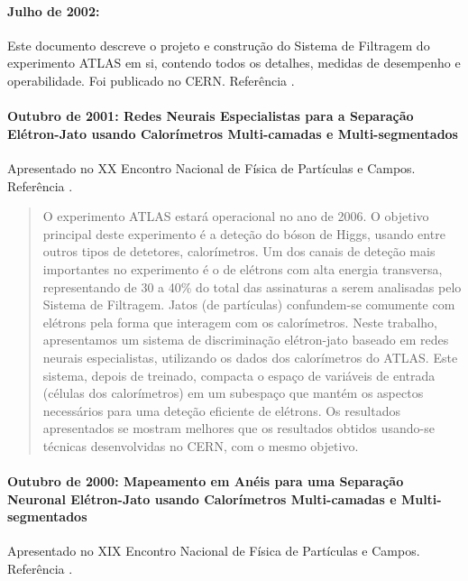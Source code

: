 \paragraph{Julho de 2002: } Este documento descreve o
projeto e construção do Sistema de Filtragem do experimento ATLAS em si,
contendo todos os detalhes, medidas de desempenho e operabilidade. Foi
publicado no CERN. Referência \cite{hlt-tdr}.

\paragraph{Outubro de 2001: Redes Neurais Especialistas para a Separação
Elétron-Jato usando Calorímetros Multi-camadas e Multi-segmentados}
Apresentado no XX Encontro Nacional de Física de Partículas e
Campos. Referência \cite{aa:enfpc-01}.

\begin{quotation}
O experimento ATLAS estará operacional no ano de 2006. O objetivo principal
deste experimento é a deteção do bóson de Higgs, usando entre outros tipos de
detetores, calorímetros. Um dos canais de deteção mais importantes no
experimento é o de elétrons com alta energia transversa, representando de 30 a
40\% do total das assinaturas a serem analisadas pelo Sistema de
Filtragem. Jatos (de partículas) confundem-se comumente com elétrons pela
forma que interagem com os calorímetros. Neste trabalho, apresentamos um
sistema de discriminação elétron-jato baseado em redes neurais especialistas,
utilizando os dados dos calorímetros do ATLAS. Este sistema, depois de
treinado, compacta o espaço de variáveis de entrada (células dos calorímetros)
em um subespaço que mantém os aspectos necessários para uma deteção eficiente
de elétrons. Os resultados apresentados se mostram melhores que os resultados
obtidos usando-se técnicas desenvolvidas no CERN, com o mesmo objetivo.
\end{quotation}

\paragraph{Outubro de 2000: Mapeamento em An\'eis para uma Separa\c{c}\~ao
Neuronal El\'etron-Jato usando Calor\'imetros Multi-camadas e
Multi-segmentados} Apresentado no XIX Encontro Nacional de Física de
Partículas e Campos. Referência \cite{aa:enfpc-00}.

